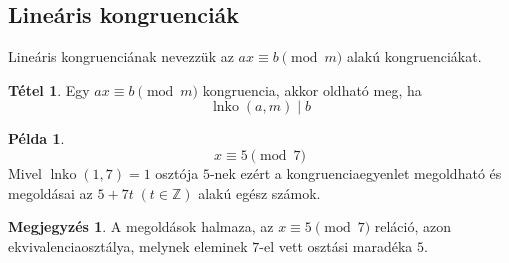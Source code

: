 \documentclass[a4paper,12pt]{article}
\DeclareMathOperator{\lnko}{lnko}
\theoremstyle{definition}
\newtheorem*{remark}{Megjegyzés}
\newtheorem*{theorem*}{Tétel}
\newtheorem*{example}{Példa}
\begin{document}
\subsection{Lineáris kongruenciák}
Lineáris kongruenciának nevezzük az $ ax \equiv b \pmod m $ alakú kongruenciákat.
\begin{theorem*}
	Egy $ ax \equiv b \pmod m$ kongruencia, akkor oldható meg, ha $$ \lnko{(a,m)} \mid b $$ 
\end{theorem*}

\begin{example}
	$$ x \equiv 5 \pmod 7 $$
	Mivel $ \lnko(1,7) = 1 $ osztója $5$-nek ezért a kongruenciaegyenlet megoldható és megoldásai az $5 + 7t \; (t \in \mathbb{Z})$ alakú egész számok.
	\begin{remark}
		A megoldások halmaza, az $ x \equiv 5 \pmod 7 $ reláció, azon ekvivalenciaosztálya, melynek eleminek $7$-el vett osztási maradéka $5$.
	\end{remark}
\end{example}
\end{document}

